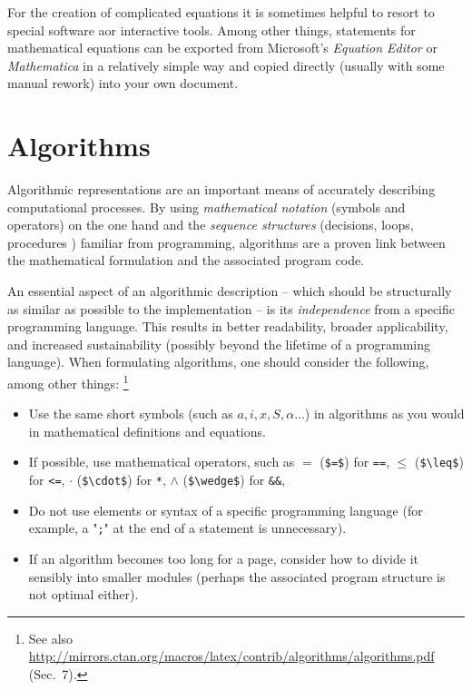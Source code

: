 For the creation of complicated equations it is sometimes helpful to resort 
to special software aor interactive tools. Among other things, \latex statements
for mathematical equations can be exported from Microsoft's \emph{Equation Editor}
or \emph{Mathematica} in a relatively simple way and copied directly (usually
with some manual rework) into your own \latex document.


\section{Algorithms}


Algorithmic representations are an important means of accurately describing
computational processes. By using \emph{mathematical notation} (symbols and 
operators) on the one hand and the \emph{sequence structures} (decisions, 
loops, procedures \etc) familiar from programming, algorithms are a proven 
link between the mathematical formulation and the associated program code.

An essential aspect of an algorithmic description -- which should be
structurally as similar as possible to the implementation -- 
is its \emph{independence} from a specific programming language.
This results in better readability, broader applicability, and increased
sustainability (possibly beyond the lifetime of a programming language).
When formulating algorithms, one should consider the following, among other
things:%
\footnote{See also
\url{http://mirrors.ctan.org/macros/latex/contrib/algorithms/algorithms.pdf}
(Sec.~7).}
%
\begin{itemize}
	\item
	Use the same short symbols (such as $a, i, x, S, \alpha \ldots$) in
	algorithms as you would in mathematical definitions and equations.
	\item
	If possible, use mathematical operators, such as 
	$=$ (\verb!$=$!) for \texttt{==},
	$\leq$ (\verb!$\leq$!) for \texttt{<=},
	$\cdot$ (\verb!$\cdot$!) for \texttt{*},
	$\wedge$ (\verb!$\wedge$!) for \texttt{\&\&},
	\etc
	\item
	Do not use elements or syntax of a specific programming language (for
	example, a "\texttt{;}" at the end of a statement is unnecessary).
	\item
	If an algorithm becomes too long for a page, consider how to divide it
	sensibly into smaller modules (perhaps the associated program structure
	is not optimal either).
\end{itemize}


